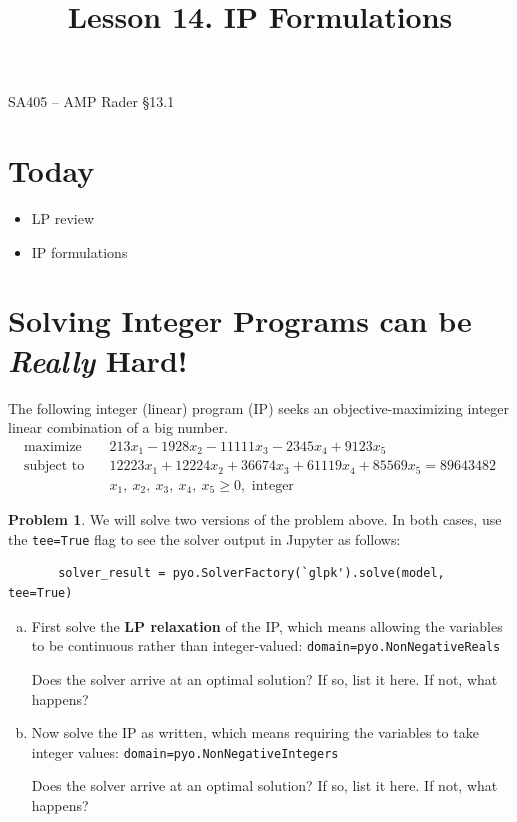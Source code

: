\documentclass[11pt]{article}
\makeatletter
\renewcommand{\labelitemi}{$\bullet$}
\theoremstyle{definition}
\newtheorem{problem}{Problem}
\newcommand{\answerbox}[3]{%
  \fbox{%
    \begin{minipage}[#1]{#2}
      \hfill\vspace{#3}
    \end{minipage}
  }
}
\newcommand{\answerboxone}[2]{%
  \answerbox{#1}{6.0in}{#2} 
}
\newcommand{\maximize}{\text{maximize}}
\newcommand{\subjectto}{\text{subject to}}
\renewcommand{\maketitle}{
  \noindent SA405 -- AMP \hfill Rader \S 13.1  \\

  \begin{center}\Large{\textbf{\@title}}\end{center}
}
\makeatother
\begin{document}
  
\title{Lesson 14.  IP Formulations}

\maketitle

\section{Today}
\renewcommand\labelitemi{--}
\begin{itemize}
\item  LP review
\item  IP formulations
\end{itemize}

\section{Solving Integer Programs can be \emph{Really} Hard!}

The following integer (linear) program (IP) seeks an objective-maximizing integer linear combination of a big number. 
\begin{align*}
      \maximize \quad & 213x_1 - 1928x_2 - 11111x_3 - 2345x_4 + 9123x_5
\\
      \subjectto \quad & 12223x_1 + 12224x_2 + 36674x_3 + 61119x_4 + 85569x_5 = 89643482\\
                       & x_1,~x_2,~x_3,~x_4,~x_5 \ge 0, \text{ integer }
\end{align*}

\begin{problem}
We will solve two versions of the problem above.  
In both cases, use the \texttt{tee=True} flag to see the solver output in Jupyter as follows:

\vspace{-.5cm}
\begin{verbatim}
       solver_result = pyo.SolverFactory(`glpk').solve(model, tee=True)
\end{verbatim}

\begin{enumerate}[(a)]
\item  First solve the \textbf{LP relaxation} of the IP, which means allowing the variables to be continuous rather than integer-valued:  \texttt{domain=pyo.NonNegativeReals}

Does the solver arrive at an optimal solution? If so, list it here.  If not, what happens? \\ 
\answerboxone{c}{.5in}
\item Now solve the IP as written, which means requiring the variables to take integer values:  \texttt{domain=pyo.NonNegativeIntegers}

Does the solver arrive at an optimal solution? If so, list it here.  If not, what happens? \\ 
\answerboxone{c}{.5in}
\end{enumerate}
\end{problem}
\end{document}
